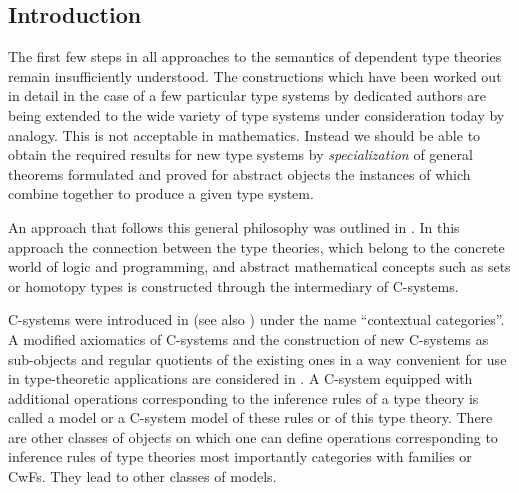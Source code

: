 \documentclass[11pt]{article}
\begin{document}

\tableofcontents

\subsection{Introduction}

The first few steps in all approaches to the semantics of dependent type theories remain insufficiently understood. The constructions which have been worked out in detail in the case of a few particular type systems by dedicated authors are being extended to the wide variety of type systems under consideration today by analogy. This is not acceptable in mathematics. Instead we should be able to obtain the required results for new type systems by {\em specialization} of general theorems formulated and proved for abstract objects the instances of which combine together to produce a given type system. 





An approach that follows this general philosophy was outlined in \cite{CMUtalk}. In this approach the connection between the type theories, which belong to the concrete world of logic and programming, and abstract mathematical concepts such as sets or homotopy types is constructed through the intermediary of C-systems. 

C-systems were introduced in \cite{Cartmell0} (see also \cite{Cartmell1}) under the name ``contextual categories''. A modified axiomatics of C-systems and the construction of new C-systems as sub-objects and regular quotients of the existing ones in a way convenient for use in type-theoretic applications are considered in \cite{Csubsystems}. A C-system equipped with additional operations corresponding to the inference rules of a type theory is called a model or a C-system model of these rules or of this type theory. There are other classes of objects on which one can define operations corresponding to inference rules of type theories most importantly categories with families or CwFs. They lead to other classes of models.  
\end{document}
